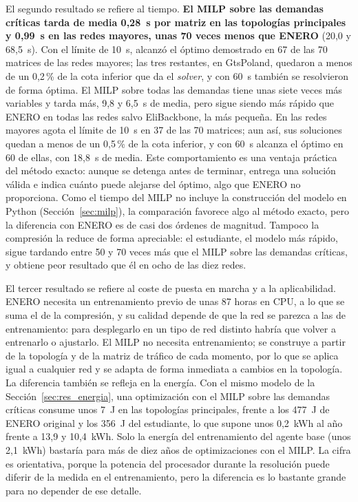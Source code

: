 El segundo resultado se refiere al tiempo. \textbf{El MILP sobre las demandas críticas tarda de media 0,28~s por matriz en las topologías principales y 0,99~s en las redes mayores, unas 70 veces menos que ENERO} (20,0 y 68,5~s). Con el límite de 10~s, alcanzó el óptimo demostrado en 67 de las 70 matrices de las redes mayores; las tres restantes, en GtsPoland, quedaron a menos de un 0,2\,\% de la cota inferior que da el \textit{solver}, y con 60~s también se resolvieron de forma óptima. El MILP sobre todas las demandas tiene unas siete veces más variables y tarda más, 9,8 y 6,5~s de media, pero sigue siendo más rápido que ENERO en todas las redes salvo EliBackbone, la más pequeña. En las redes mayores agota el límite de 10~s en 37 de las 70 matrices; aun así, sus soluciones quedan a menos de un 0,5\,\% de la cota inferior, y con 60~s alcanza el óptimo en 60 de ellas, con 18,8~s de media. Este comportamiento es una ventaja práctica del método exacto: aunque se detenga antes de terminar, entrega una solución válida e indica cuánto puede alejarse del óptimo, algo que ENERO no proporciona. Como el tiempo del MILP no incluye la construcción del modelo en Python (Sección~\ref{sec:milp}), la comparación favorece algo al método exacto, pero la diferencia con ENERO es de casi dos órdenes de magnitud. Tampoco la compresión la reduce de forma apreciable: el estudiante, el modelo más rápido, sigue tardando entre 50 y 70 veces más que el MILP sobre las demandas críticas, y obtiene peor resultado que él en ocho de las diez redes.

El tercer resultado se refiere al coste de puesta en marcha y a la aplicabilidad. ENERO necesita un entrenamiento previo de unas 87 horas en CPU, a lo que se suma el de la compresión, y su calidad depende de que la red se parezca a las de entrenamiento: para desplegarlo en un tipo de red distinto habría que volver a entrenarlo o ajustarlo. El MILP no necesita entrenamiento; se construye a partir de la topología y de la matriz de tráfico de cada momento, por lo que se aplica igual a cualquier red y se adapta de forma inmediata a cambios en la topología. La diferencia también se refleja en la energía. Con el mismo modelo de la Sección~\ref{sec:res_energia}, una optimización con el MILP sobre las demandas críticas consume unos 7~J en las topologías principales, frente a los 477~J de ENERO original y los 356~J del estudiante, lo que supone unos 0,2~kWh al año frente a 13,9 y 10,4~kWh. Solo la energía del entrenamiento del agente base (unos 2,1~kWh) bastaría para más de diez años de optimizaciones con el MILP. La cifra es orientativa, porque la potencia del procesador durante la resolución puede diferir de la medida en el entrenamiento, pero la diferencia es lo bastante grande para no depender de ese detalle.

